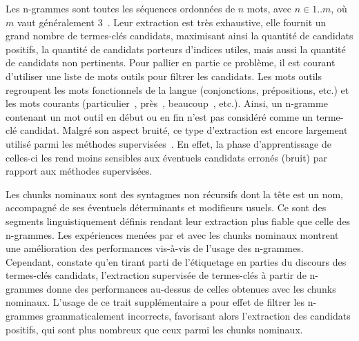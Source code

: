     Les n-grammes sont toutes les séquences ordonnées de $n$ mots, avec
    $n \in 1..m$, où $m$ vaut généralement
    3~\cite{witten1999kea,turney1999learningalgorithms,hulth2003keywordextraction}.
    Leur extraction est très exhaustive, elle fournit un grand nombre de
    termes-clés candidats, maximisant ainsi la quantité de candidats positifs,
    la quantité de candidats porteurs d'indices utiles, mais aussi la quantité
    de candidats non pertinents. Pour pallier en partie ce problème, il est
    courant d'utiliser une liste de mots outils pour filtrer les candidats. Les
    mots outils regroupent les mots fonctionnels de la langue (conjonctions,
    prépositions, etc.) et les mots courants (\og particulier~\fg, \og près~\fg,
    \og beaucoup~\fg, etc.). Ainsi, un n-gramme contenant un mot outil en début
    ou en fin n'est pas considéré comme un terme-clé candidat. Malgré son aspect
    bruité, ce type d'extraction est encore largement utilisé parmi les méthodes
    supervisées~\cite{witten1999kea,turney1999learningalgorithms,hulth2003keywordextraction}.
    En effet, la phase d'apprentissage de celles-ci les rend moins sensibles aux
    éventuels candidats erronés (bruit) par rapport aux méthodes supervisées.

    Les chunks nominaux sont des syntagmes non récursifs dont la tête est un
    nom, accompagné de ses éventuels déterminants et modifieurs usuels. Ce sont
    des segments linguistiquement définis rendant leur extraction plus fiable
    que celle des n-grammes. Les expériences menées par
     et  avec les
    chunks nominaux montrent une amélioration des performances vis-à-vis de
    l'usage des n-grammes. Cependant, 
    constate qu'en tirant parti de l'étiquetage en parties du discours des
    termes-clés candidats, l'extraction supervisée de termes-clés à partir de
    n-grammes donne des performances au-dessus de celles obtenues avec les
    chunks nominaux. L'usage de ce trait supplémentaire a pour effet de filtrer
    les n-grammes grammaticalement incorrects, favorisant alors l'extraction des
    candidats positifs, qui sont plus nombreux que ceux parmi les chunks
    nominaux.

